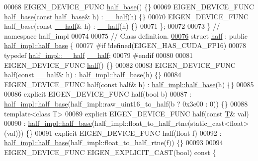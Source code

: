 \begin{DoxyCode}
00068   EIGEN\_DEVICE\_FUNC \hyperlink{struct_eigen_1_1half__impl_1_1half__base}{half\_base}() \{\}
00069   EIGEN\_DEVICE\_FUNC \hyperlink{struct_eigen_1_1half__impl_1_1half__base}{half\_base}(\textcolor{keyword}{const} \hyperlink{struct_eigen_1_1half__impl_1_1half__base}{half\_base}& h) : \hyperlink{struct_eigen_1_1half__impl_1_1____half}{\_\_half}(h) \{\}
00070   EIGEN\_DEVICE\_FUNC half\_base(\textcolor{keyword}{const} \hyperlink{struct_eigen_1_1half__impl_1_1____half}{\_\_half}& h) : \hyperlink{struct_eigen_1_1half__impl_1_1____half}{\_\_half}(h) \{\}
00071 \};
00072 
00073 \} \textcolor{comment}{// namespace half\_impl}
00074 
00075 \textcolor{comment}{// Class definition.}
\hyperlink{struct_eigen_1_1half}{00076} \textcolor{keyword}{struct }\hyperlink{struct_eigen_1_1half}{half} : \textcolor{keyword}{public} \hyperlink{struct_eigen_1_1half__impl_1_1half__base}{half\_impl::half\_base} \{
00077 \textcolor{preprocessor}{  #if !defined(EIGEN\_HAS\_CUDA\_FP16)}
00078     \textcolor{keyword}{typedef} \hyperlink{struct_eigen_1_1half__impl_1_1____half}{half\_impl::\_\_half} \hyperlink{struct_eigen_1_1half__impl_1_1____half}{\_\_half};
00079 \textcolor{preprocessor}{  #endif}
00080 
00081   EIGEN\_DEVICE\_FUNC \hyperlink{struct_eigen_1_1half}{half}() \{\}
00082 
00083   EIGEN\_DEVICE\_FUNC \hyperlink{struct_eigen_1_1half}{half}(\textcolor{keyword}{const} \_\_half& h) : \hyperlink{struct_eigen_1_1half__impl_1_1half__base}{half\_impl::half\_base}(h) \{\}
00084   EIGEN\_DEVICE\_FUNC half(\textcolor{keyword}{const} half& h) : \hyperlink{struct_eigen_1_1half__impl_1_1half__base}{half\_impl::half\_base}(h) \{\}
00085 
00086   \textcolor{keyword}{explicit} EIGEN\_DEVICE\_FUNC half(\textcolor{keywordtype}{bool} b)
00087       : \hyperlink{struct_eigen_1_1half__impl_1_1half__base}{half\_impl::half\_base}(half\_impl::raw\_uint16\_to\_half(b ? 0x3c00 : 0)) \{\}
00088   \textcolor{keyword}{template}<\textcolor{keyword}{class} T>
00089   \textcolor{keyword}{explicit} EIGEN\_DEVICE\_FUNC half(\textcolor{keyword}{const} \hyperlink{group___sparse_core___module}{T}& val)
00090       : \hyperlink{struct_eigen_1_1half__impl_1_1half__base}{half\_impl::half\_base}(half\_impl::float\_to\_half\_rtne(static\_cast<float>(val))) \{\}
00091   \textcolor{keyword}{explicit} EIGEN\_DEVICE\_FUNC half(\textcolor{keywordtype}{float} f)
00092       : \hyperlink{struct_eigen_1_1half__impl_1_1half__base}{half\_impl::half\_base}(half\_impl::float\_to\_half\_rtne(f)) \{\}
00093 
00094   EIGEN\_DEVICE\_FUNC EIGEN\_EXPLICIT\_CAST(\textcolor{keywordtype}{bool})\textcolor{keyword}{ const }\{

\end{DoxyCode}
